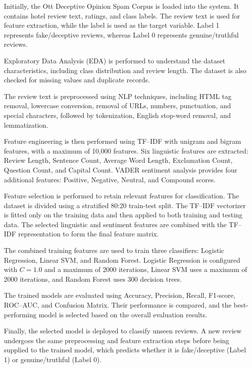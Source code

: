 \documentclass[12pt,a4paper]{report}
\begin{document}
Initially, the Ott Deceptive Opinion Spam Corpus is loaded into the system. It contains hotel review text, ratings, and class labels. The review text is used for feature extraction, while the label is used as the target variable. Label 1 represents fake/deceptive reviews, whereas Label 0 represents genuine/truthful reviews.

Exploratory Data Analysis (EDA) is performed to understand the dataset characteristics, including class distribution and review length. The dataset is also checked for missing values and duplicate records.

The review text is preprocessed using NLP techniques, including HTML tag removal, lowercase conversion, removal of URLs, numbers, punctuation, and special characters, followed by tokenization, English stop-word removal, and lemmatization.

Feature engineering is then performed using TF--IDF with unigram and bigram features, with a maximum of 10,000 features. Six linguistic features are extracted: Review Length, Sentence Count, Average Word Length, Exclamation Count, Question Count, and Capital Count. VADER sentiment analysis provides four additional features: Positive, Negative, Neutral, and Compound scores.

Feature selection is performed to retain relevant features for classification. The dataset is divided using a stratified 80:20 train-test split. The TF--IDF vectorizer is fitted only on the training data and then applied to both training and testing data. The selected linguistic and sentiment features are combined with the TF--IDF representation to form the final feature matrix.

The combined training features are used to train three classifiers: Logistic Regression, Linear SVM, and Random Forest. Logistic Regression is configured with $C=1.0$ and a maximum of 2000 iterations, Linear SVM uses a maximum of 2000 iterations, and Random Forest uses 300 decision trees.

The trained models are evaluated using Accuracy, Precision, Recall, F1-score, ROC--AUC, and Confusion Matrix. Their performance is compared, and the best-performing model is selected based on the overall evaluation results.

Finally, the selected model is deployed to classify unseen reviews. A new review undergoes the same preprocessing and feature extraction steps before being supplied to the trained model, which predicts whether it is fake/deceptive (Label 1) or genuine/truthful (Label 0).
\end{document}
